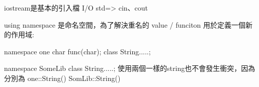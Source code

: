 
iostream是基本的引入檔 I/O
std=> cin、cout

using namespace 是命名空間，為了解決重名的 value / funciton 用於定義一個新的作用域:

namespace one
{
    char func(char);
    class String{.....};
}

namespace SomeLib
{
    class String{.....};
}
使用兩個一樣的string也不會發生衝突，因為分別為
one::String()
SomLib::String()

